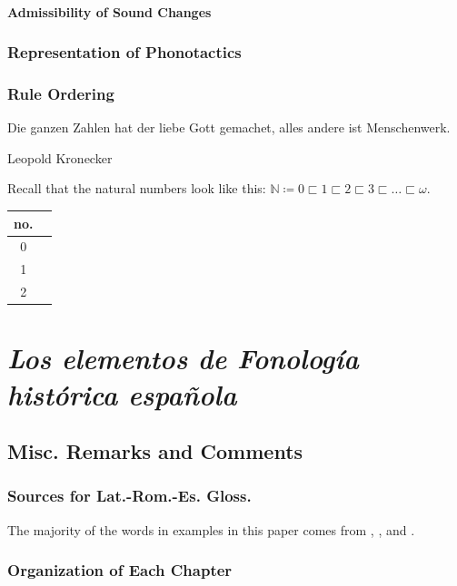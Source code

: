 \documentclass{report}[12pt]
\begin{document}
\subsection{Admissibility of Sound Changes}

\section{Representation of Phonotactics}

\section{Rule Ordering}

\epigraph{Die ganzen Zahlen hat der liebe Gott gemachet, alles andere ist Menschenwerk.}{Leopold Kronecker}

Recall that the natural numbers look like this: $\mathbb{N} \coloneq 0 \sqsubset 1 \sqsubset 2 \sqsubset 3 \sqsubset \dots \sqsubset \omega$.

\begin{center}
  \begin{tabular}{c|c}
    no. & \\
    \hline
    0 & \nameref{sec:deaffric_dental_affric} \\
    \hline
    1 & \nameref{sec:devoice_fric} \\
    \hline
    2 & \nameref{sec:desibil_dental_fric} \\
  \end{tabular}
\end{center}

\part{\emph{Los elementos de Fonología histórica española}}

\chapter{Misc. Remarks and Comments}

\section{Sources for Lat.-Rom.-Es. Gloss.}

The majority of the words in examples in this paper comes from \cite{romance_his}, \cite{lloyd_spanish}, and \cite{penny_spanish}. 

\section{Organization of Each Chapter}
\end{document}
